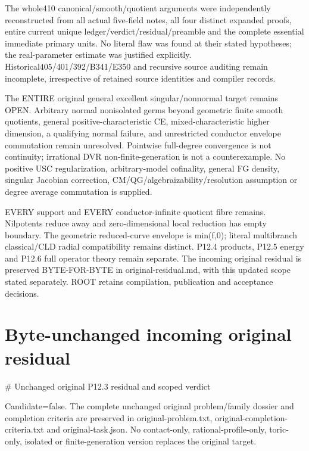 \documentclass[11pt]{article}
\begin{document}
The whole410 canonical/smooth/quotient arguments were independently reconstructed from all actual five-field notes, all four distinct expanded proofs, entire current unique ledger/verdict/residual/preamble and the complete essential immediate primary units. No literal flaw was found at their stated hypotheses; the real-parameter estimate was justified explicitly. Historical405/401/392/B341/E350 and recursive source auditing remain incomplete, irrespective of retained source identities and compiler records.

The ENTIRE original general excellent singular/nonnormal target remains OPEN. Arbitrary normal nonisolated germs beyond geometric finite smooth quotients, general positive-characteristic CE, mixed-characteristic higher dimension, a qualifying normal failure, and unrestricted conductor envelope commutation remain unresolved. Pointwise full-degree convergence is not continuity; irrational DVR non-finite-generation is not a counterexample. No positive USC regularization, arbitrary-model cofinality, general FG density, singular Jacobian correction, CM/QG/algebraizability/resolution assumption or degree average commutation is supplied.

EVERY support and EVERY conductor-infinite quotient fibre remains. Nilpotents reduce away and zero-dimensional local reduction has empty boundary. The geometric reduced-curve envelope is min(f,0); literal multibranch classical/CLD radial compatibility remains distinct. P12.4 products, P12.5 energy and P12.6 full operator theory remain separate. The incoming original residual is preserved BYTE-FOR-BYTE in original-residual.md, with this updated scope stated separately. ROOT retains compilation, publication and acceptance decisions.


\section*{Byte-unchanged incoming original residual}
\# Unchanged original P12.3 residual and scoped verdict

Candidate=false. The complete unchanged original problem/family dossier and completion criteria are preserved in original-problem.txt, original-completion-criteria.txt and original-task.json. No contact-only, rational-profile-only, toric-only, isolated or finite-generation version replaces the original target.
\end{document}

